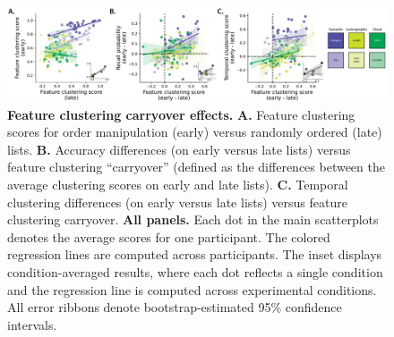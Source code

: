 \documentclass[11pt]{article}
\begin{document}
\begin{figure}[tp] \centering
    \includegraphics[width=\textwidth]{figures/clustering_carryover}

    \caption{\textbf{Feature clustering carryover effects.} \textbf{A.} Feature
    clustering scores for order manipulation (early) versus randomly ordered
    (late) lists. \textbf{B.} Accuracy differences (on early versus late lists)
    versus feature clustering ``carryover'' (defined as the differences between
    the average clustering scores on early and late lists). \textbf{C.}
    Temporal clustering differences (on early versus late lists) versus feature
    clustering carryover. \textbf{All panels.} Each dot in the main
    scatterplots denotes the average scores for one participant. The colored
    regression lines are computed across participants. The inset displays
    condition-averaged results, where each dot reflects a single condition and
    the regression line is computed across experimental conditions. All error
    ribbons denote bootstrap-estimated 95\% confidence intervals.}
    \label{fig:clustering-carryover}

\end{figure}
\end{document}
